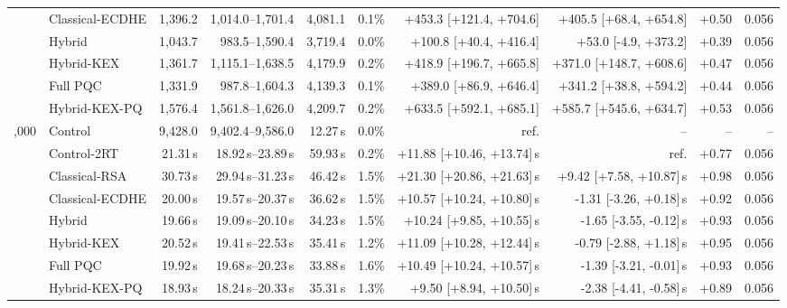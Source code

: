 \begin{table}[t]
\begin{tabular}{@{}rlrrrrrrrr@{}}
 & Classical-ECDHE & 1,396.2 & 1,014.0--1,701.4 & 4,081.1 & 0.1\% & +453.3 [+121.4, +704.6] & +405.5 [+68.4, +654.8] & +0.50 & 0.056 \\
 & Hybrid & 1,043.7 & 983.5--1,590.4 & 3,719.4 & 0.0\% & +100.8 [+40.4, +416.4] & +53.0 [-4.9, +373.2] & +0.39 & 0.056 \\
 & Hybrid-KEX & 1,361.7 & 1,115.1--1,638.5 & 4,179.9 & 0.2\% & +418.9 [+196.7, +665.8] & +371.0 [+148.7, +608.6] & +0.47 & 0.056 \\
 & Full PQC & 1,331.9 & 987.8--1,604.3 & 4,139.3 & 0.1\% & +389.0 [+86.9, +646.4] & +341.2 [+38.8, +594.2] & +0.44 & 0.056 \\
 & Hybrid-KEX-PQ & 1,576.4 & 1,561.8--1,626.0 & 4,209.7 & 0.2\% & +633.5 [+592.1, +685.1] & +585.7 [+545.6, +634.7] & +0.53 & 0.056 \\
\addlinespace
1,000 & Control & 9,428.0 & 9,402.4--9,586.0 & 12.27\,s & 0.0\% & ref. & -- & -- & -- \\
 & Control-2RT & 21.31\,s & 18.92\,s--23.89\,s & 59.93\,s & 0.2\% & +11.88 [+10.46, +13.74]\,s & ref. & +0.77 & 0.056 \\
 & Classical-RSA & 30.73\,s & 29.94\,s--31.23\,s & 46.42\,s & 1.5\% & +21.30 [+20.86, +21.63]\,s & +9.42 [+7.58, +10.87]\,s & +0.98 & 0.056 \\
 & Classical-ECDHE & 20.00\,s & 19.57\,s--20.37\,s & 36.62\,s & 1.5\% & +10.57 [+10.24, +10.80]\,s & -1.31 [-3.26, +0.18]\,s & +0.92 & 0.056 \\
 & Hybrid & 19.66\,s & 19.09\,s--20.10\,s & 34.23\,s & 1.5\% & +10.24 [+9.85, +10.55]\,s & -1.65 [-3.55, -0.12]\,s & +0.93 & 0.056 \\
 & Hybrid-KEX & 20.52\,s & 19.41\,s--22.53\,s & 35.41\,s & 1.2\% & +11.09 [+10.28, +12.44]\,s & -0.79 [-2.88, +1.18]\,s & +0.95 & 0.056 \\
 & Full PQC & 19.92\,s & 19.68\,s--20.23\,s & 33.88\,s & 1.6\% & +10.49 [+10.24, +10.57]\,s & -1.39 [-3.21, -0.01]\,s & +0.93 & 0.056 \\
 & Hybrid-KEX-PQ & 18.93\,s & 18.24\,s--20.33\,s & 35.31\,s & 1.3\% & +9.50 [+8.94, +10.50]\,s & -2.38 [-4.41, -0.58]\,s & +0.89 & 0.056 \\
\bottomrule
\end{tabular}
\end{table}
